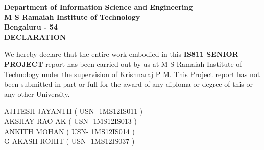 \begin{center}
\thispagestyle{empty}
\bfseries
\large{Department of Information Science and Engineering \\
M S Ramaiah Institute of Technology \\
Bengaluru - 54} \\
{ }
\LARGE{DECLARATION} \\
\end{center}
\vspace{0.5in}
\large{
We hereby declare that the entire work embodied in this \textbf{IS811 SENIOR PROJECT} report has been carried out by us at M S Ramaiah Institute of Technology under the supervision of Krishnaraj P M. This Project report has not been submitted in part or full for the award of any diploma or degree of this or any other University.} \\
\vspace{0.5in}
\begin{flushleft}
\small{ AJITESH JAYANTH ( USN- 1MS12IS011 ) \\ AKSHAY RAO AK ( USN- 1MS12IS013 ) \\ ANKITH MOHAN ( USN- 1MS12IS014 ) \\ G AKASH ROHIT ( USN- 1MS12IS037 ) }
\end{flushleft}



